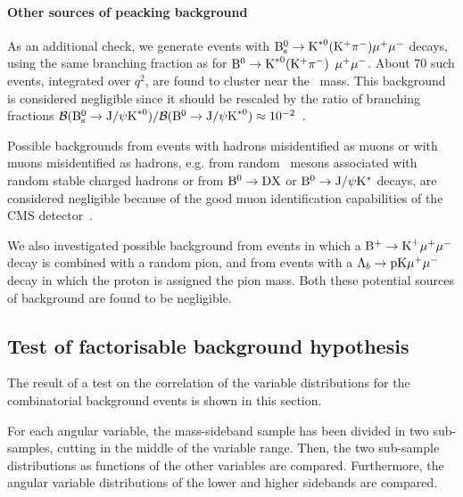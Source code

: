 \paragraph{Other sources of peacking background}
\label{sec:PeakBkg}

As an additional check, we generate events with ${\textrm{B}}{}^{0}_{\mathrm{s}} \to \textrm{K}^{\ast0}({\rm K}^+ \pi^-) \mu^{+} \mu^{-}$ decays, using the same branching fraction as for ${\textrm{B}}{}^{0} \to \textrm{K}^{\ast0}({\rm K}^+ \pi^-)$ $\mu^{+} \mu^{-}$.
About 70 such events, integrated over $q^2$, are found to cluster near the \PBs\ mass.
This background is considered negligible since it should be rescaled by the ratio of branching fractions $\mathcal{B}({\textrm{B}}{}^{0}_{\mathrm{s}} \to \textrm{J}/\psi \textrm{K}^{\ast0}) / \mathcal{B}({\textrm{B}}{}^{0}\to\textrm{J}/\psi \textrm{K}^{\ast0}) \approx 10^{-2}$~\cite{PDG}.

Possible backgrounds from events with hadrons misidentified as muons or with muons misidentified as hadrons, e.g. from random \PD\ mesons associated with random stable charged hadrons or from ${\textrm{B}}{}^{0} \to {\textrm{D}} {\rm X}$ or ${\textrm{B}}{}^{0} \to {\rm J}/\psi {\rm K}^*$ decays, are considered negligible because of the good muon identification capabilities of the CMS detector~\cite{Chatrchyan:2012xi}.

We also investigated possible background from events in which a ${\textrm{B}}{}^{+} \to \textrm{K}^{+} \mu^{+} \mu^{-}$ decay is combined with a random pion, and from events with a $\Lambda_b \to \mathrm{p} \mathrm{K} \mu^{+} \mu^{-}$ decay in which the proton is assigned the pion mass.
Both these potential sources of background are found to be negligible.


\subsection{Test of factorisable background hypothesis}
\label{sec:fact}

The result of a test on the correlation of the variable distributions for the combinatorial background events is shown in this section.

For each angular variable, the mass-sideband sample has been divided in two sub-samples, cutting in the middle of the variable range.
Then, the two sub-sample distributions as functions of the other variables are compared.
Furthermore, the angular variable distributions of the lower and higher sidebands are compared.

